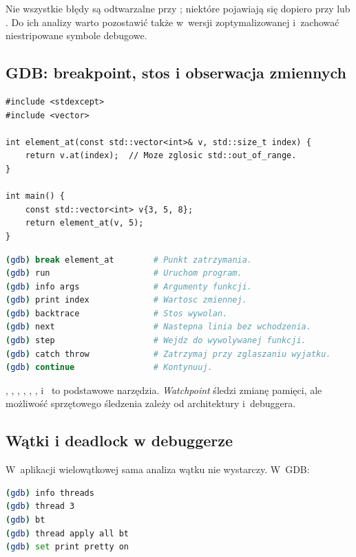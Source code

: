 Nie wszystkie błędy są odtwarzalne przy ; niektóre pojawiają
się dopiero przy  lub . Do ich analizy warto
pozostawić  także w~wersji zoptymalizowanej i~zachować
niestripowane symbole debugowe.

\subsection{GDB: breakpoint, stos i obserwacja zmiennych}

\begin{lstlisting}[caption={Program do cwiczenia debugowania.}]
#include <stdexcept>
#include <vector>

int element_at(const std::vector<int>& v, std::size_t index) {
    return v.at(index);  // Moze zglosic std::out_of_range.
}

int main() {
    const std::vector<int> v{3, 5, 8};
    return element_at(v, 5);
}
\end{lstlisting}

\begin{lstlisting}[language=bash,caption={Typowa sesja w GDB.}]
(gdb) break element_at        # Punkt zatrzymania.
(gdb) run                     # Uruchom program.
(gdb) info args               # Argumenty funkcji.
(gdb) print index             # Wartosc zmiennej.
(gdb) backtrace               # Stos wywolan.
(gdb) next                    # Nastepna linia bez wchodzenia.
(gdb) step                    # Wejdz do wywolywanej funkcji.
(gdb) catch throw             # Zatrzymaj przy zglaszaniu wyjatku.
(gdb) continue                # Kontynuuj.
\end{lstlisting}

, , , ,
, ,  i~ to podstawowe
narzędzia. \emph{Watchpoint} śledzi zmianę pamięci, ale możliwość
sprzętowego śledzenia zależy od architektury i~debuggera.

\subsection{Wątki i deadlock w debuggerze}

W~aplikacji wielowątkowej sama analiza wątku  nie
wystarczy. W~GDB:

\begin{lstlisting}[language=bash,caption={Diagnostyka wielowatkowosci w GDB.}]
(gdb) info threads
(gdb) thread 3
(gdb) bt
(gdb) thread apply all bt
(gdb) set print pretty on
\end{lstlisting}

